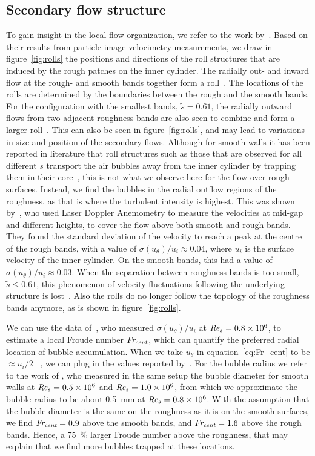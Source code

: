\documentclass[aps,twocolumn,10pt,floatfix, superscriptaddress,longbibliography,pra]{revtex4-1}
\newcommand\Rey{\mbox{\textit{Re$_s$}}}  %
\newcommand\Frcent{\mbox{\textit{Fr$_\text{cent}$}}}  %
\newcommand{\e}[1]{\times 10^{#1}}
\begin{document}
\subsection{Secondary flow structure}
To gain insight in the local flow organization, we refer to the work by~\cite{Bakhuis2019}. Based on their results from particle image velocimetry measurements, we draw in figure~\ref{fig:rolls} the positions and directions of the roll structures that are induced by the rough patches on the inner cylinder. The radially out- and inward flow at the rough- and smooth bands together form a roll~\citep{Bakhuis2019}. The locations of the rolls are determined by the boundaries between the rough and the smooth bands. For the configuration with the smallest bands, $\tilde{s} = 0.61$, the radially outward flows from two adjacent roughness bands are also seen to combine and form a larger roll~\citep{Bakhuis2019}. This can also be seen in figure~\ref{fig:rolls}, and may lead to variations in size and position of the secondary flows. Although for smooth walls it has been reported in literature that roll structures such as those that are observed for all different $\tilde{s}$ transport the air bubbles away from the inner cylinder by trapping them in their core~\citep{Mazzitelli2003,Climent2007,Lohse2018}, this is not what we observe here for the flow over rough surfaces. Instead, we find the bubbles in the radial outflow regions of the roughness, as that is where the turbulent intensity is highest.
This was shown by~\cite{Bakhuis2019}, who used Laser Doppler Anemometry to measure the velocities at mid-gap and different heights, to cover the flow above both smooth and rough bands. They found the standard deviation of the velocity to reach a peak at the centre of the rough bands, with a value of $\sigma(u_\theta)/u_i \approx 0.04$, where $u_i$ is the surface velocity of the inner cylinder. On the smooth bands, this had a value of $\sigma(u_\theta)/u_i \approx 0.03$. When the separation between roughness bands is too small, $\tilde{s} \leq 0.61$, this  phenomenon of velocity fluctuations following the underlying structure is lost~\citep{Bakhuis2019}. Also the rolls do no longer follow the topology of the roughness bands anymore, as is shown in figure~\ref{fig:rolls}.

We can use the data of~\cite{Bakhuis2019}, who measured $\sigma(u_\theta)/u_i$ at $\Rey = 0.8\e6$, to estimate a local Froude number $\Frcent$, which can quantify the preferred radial location of bubble accumulation. When we take $u_\theta$ in equation~\ref{eq:Fr_cent} to be $\approx u_i/2$ ~\citep{Huisman2013}, we can plug in the values reported by~\cite{Bakhuis2019}. For the bubble radius we refer to the work of \cite{vanGils2013}, who measured in the same setup the bubble diameter for smooth walls at $\Rey = 0.5\e6$ and $\Rey = 1.0\e6$, from which we approximate the bubble radius to be about \SI{0.5}{\mm} at $\Rey = 0.8\e6$. With the assumption that the bubble diameter is the same on the roughness as it is on the smooth surfaces, we find $\Frcent = 0.9$ above the smooth bands, and $\Frcent = 1.6$ above the rough bands. Hence, a \SI{75}{\percent} larger Froude number above the roughness, that may explain that we find more bubbles trapped at these locations.
\end{document}

